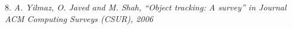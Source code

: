\begin{frame}
\begin{columns}[t]
		\vspace{0.5cm}
		
		{
		}
	\end{columns}
	
	\vspace{0.5cm}
	
	\begin{columns}
		
		{
			\vspace{0.2cm}
		}
		
		{
			\tiny 8. \emph{A. Yilmaz, O. Javed and M. Shah, ``Object tracking: A survey'' in Journal ACM Computing Surveys (CSUR), 2006}
		}
	\end{columns}
	
\end{frame}
